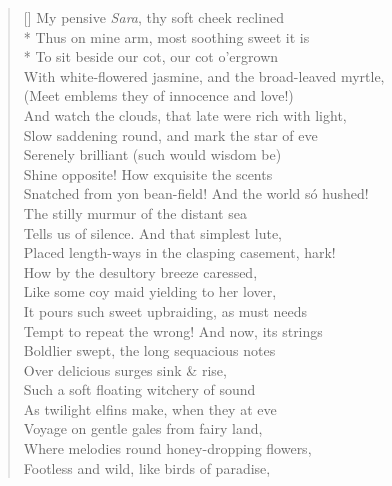 \documentclass[MAIN]{subfiles}
\begin{document}
\begin{verse}[\versewidth]
My pensive \emph{Sara}, thy soft cheek reclined\\*
Thus on mine arm, most soothing sweet it is\\*
To sit beside our cot, our cot o'ergrown\\
With white-flowered jasmine, and the broad-leaved myrtle,\\ 
(Meet emblems they of innocence and love!)\\
And watch the clouds, that late were rich with light,\\
Slow saddening round, and mark the star of eve\\
Serenely brilliant (such would wisdom be)\\
Shine opposite! How exquisite the scents\\
Snatched from yon bean-field! And the world s\'o hushed!\\
The stilly murmur of the distant sea\\
Tells us of silence. And that simplest lute,\\
Placed length-ways in the clasping casement, hark!\\
How by the desultory breeze caressed,\\
Like some coy maid  yielding to her lover,\\
It pours such sweet upbraiding, as must needs\\
Tempt to repeat the wrong! And now, its strings\\
Boldlier swept, the long sequacious notes\\
Over delicious surges sink \& rise,\\
Such a soft floating witchery of sound\\
As twilight elfins make, when they at eve\\
Voyage on gentle gales from fairy land,\\
Where melodies round honey-dropping flowers,\\
Footless and wild, like birds of paradise,\\

\end{verse}
\end{document}
